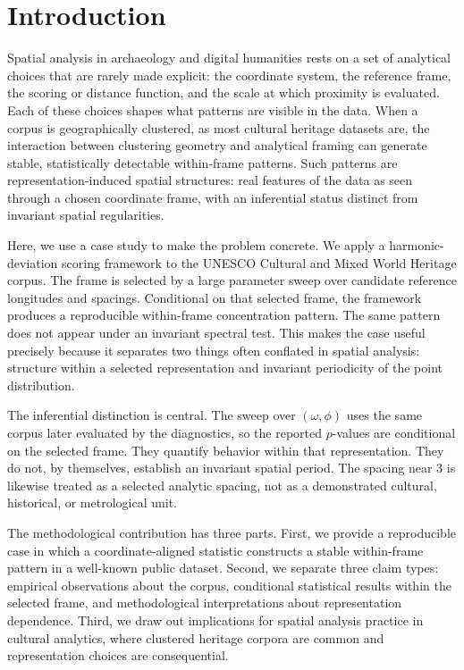 \documentclass[12pt,a4paper]{article}
\begin{document}
\section{Introduction}
\label{sec:introduction}

Spatial analysis in archaeology and digital humanities rests on a set of
analytical choices that are rarely made explicit: the coordinate system, the
reference frame, the scoring or distance function, and the scale at which
proximity is evaluated. Each of these choices shapes what patterns are visible
in the data. When a corpus is geographically clustered, as most cultural
heritage datasets are, the interaction between clustering geometry and
analytical framing can generate stable, statistically detectable within-frame
patterns. Such patterns are representation-induced spatial structures: real
features of the data as seen through a chosen coordinate frame, with an
inferential status distinct from invariant spatial regularities.

Here, we use a case study to make the problem concrete. We apply a
harmonic-deviation scoring framework to the UNESCO Cultural and Mixed World
Heritage corpus. The frame is selected by a large parameter sweep over
candidate reference longitudes and spacings. Conditional on that selected
frame, the framework produces a reproducible within-frame concentration
pattern. The same pattern does not appear under an invariant spectral test.
This makes the case useful precisely because it separates two things often
conflated in spatial analysis: structure within a selected representation and
invariant periodicity of the point distribution.

The inferential distinction is central. The sweep over $(\omega,\phi)$ uses
the same corpus later evaluated by the diagnostics, so the reported
$p$-values are conditional on the selected frame. They quantify behavior
within that representation. They do not, by themselves, establish an
invariant spatial period. The spacing near 3\textdegree{} is likewise treated
as a selected analytic spacing, not as a demonstrated cultural, historical,
or metrological unit.

The methodological contribution has three parts. First, we provide a
reproducible case in which a coordinate-aligned statistic constructs a stable
within-frame pattern in a well-known public dataset. Second, we separate three
claim types: empirical observations about the corpus, conditional statistical
results within the selected frame, and methodological interpretations about
representation dependence. Third, we draw out implications for spatial
analysis practice in cultural analytics, where clustered heritage corpora are
common and representation choices are consequential.
\end{document}
